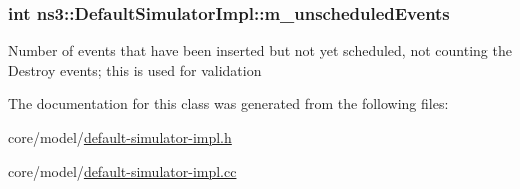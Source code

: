 \subsubsection[{\texorpdfstring{m\+\_\+unscheduled\+Events}{m_unscheduledEvents}}]{\setlength{\rightskip}{0pt plus 5cm}int ns3\+::\+Default\+Simulator\+Impl\+::m\+\_\+unscheduled\+Events\hspace{0.3cm}{\ttfamily [private]}}\hypertarget{classns3_1_1DefaultSimulatorImpl_aac2b46d6d41340194cbd291fbcb5443e}{}\label{classns3_1_1DefaultSimulatorImpl_aac2b46d6d41340194cbd291fbcb5443e}
Number of events that have been inserted but not yet scheduled, not counting the Destroy events; this is used for validation 

The documentation for this class was generated from the following files\+:\begin{DoxyCompactItemize}
\item 
core/model/\hyperlink{default-simulator-impl_8h}{default-\/simulator-\/impl.\+h}\item 
core/model/\hyperlink{default-simulator-impl_8cc}{default-\/simulator-\/impl.\+cc}\end{DoxyCompactItemize}
